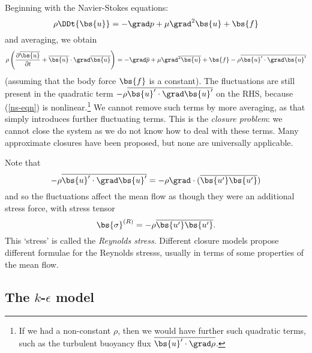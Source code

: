 Beginning with the Navier-Stokes equations:
\begin{equation}
    \rho\DDt{\bs{u}} = -\grad p + \mu\grad^2\bs{u} + \bs{f}
    \label{ns-eqn}
\end{equation}
and averaging, we obtain
\begin{equation}
    \rho\left(\frac{\partial\overline{\bs{u}}}{\partial t} + \overline{\bs{u}}\cdot\grad\overline{\bs{u}}\right)
    = -\grad\overline{p} + \mu\grad^2\overline{\bs{u}} + \bs{f} - \rho\overline{\bs{u}'\cdot\grad\bs{u}'}
    \label{ave-ns-eqn}
\end{equation}
(assuming that the body force $\bs{f}$ is a constant). The fluctuations are still present in the quadratic term $-\rho\overline{\bs{u}'\cdot\grad\bs{u}'}$ on the RHS, because (\ref{ns-eqn}) is nonlinear.\footnote{If we had a non-constant $\rho$, then we would have further such quadratic terms, such as the turbulent buoyancy flux $\overline{\bs{u}'\cdot\grad\rho}$.} 
We cannot remove such terms by more averaging, as that simply introduces further fluctuating terms. This is the \textit{closure problem}: we cannot close the system as we do not know how to deal with these terms. Many approximate closures have been proposed, but none are universally applicable.

Note that 
\begin{equation}
    -\rho\overline{\bs{u}'\cdot\grad\bs{u}'} = -\rho\grad\cdot(\overline{\bs{u'}\bs{u'}})
\end{equation}
and so the fluctuations affect the mean flow as though they were an additional
stress force, with stress tensor 
\begin{equation}
    \bs{\sigma}^{(R)} = -\rho \overline{\bs{u'}\bs{u'}}.
\end{equation}
This `stress' is called the \textit{Reynolds stress}. Different closure models propose different formulae for the Reynolds stresss, usually in terms of some properties of the mean flow. 

\subsection{The $k$-$\epsilon$ model}

